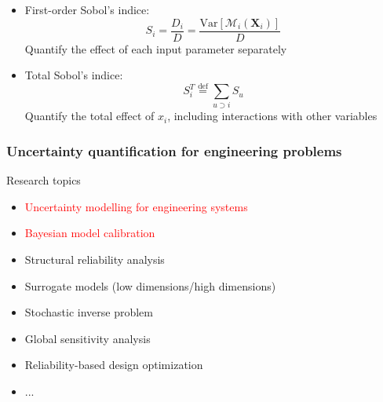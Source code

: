 \begin{frame}
{\begin{itemize}
    \item First-order Sobol's indice:
     \begin{equation*}
S_i = \frac{D_i}{D} = \frac{\text{Var}[\mathcal{M}_{i}(\boldsymbol{X}_{i}) ] }{D}
    \end{equation*}
    Quantify the effect of each input parameter \alert{separately}

    \item Total Sobol's indice:
    \begin{equation*}
S_{i}^{T} \overset{\mathrm{def}}{=}  
\sum_{u \supset i} S_u
    \end{equation*}
    Quantify the \alert{total effect} of $x_{i}$, including \alert{interactions} with other variables
\end{itemize}
}

 \end{frame}

 
\begin{frame}
\frametitle{Uncertainty quantification for engineering problems}
Research topics
\begin{itemize}
    \item \textcolor{red}{Uncertainty modelling for engineering systems}
    \item \textcolor{red}{Bayesian model calibration}
    \item Structural reliability analysis
    \item Surrogate models (low dimensions/high dimensions)
    \item Stochastic inverse problem
    \item Global sensitivity analysis
    \item Reliability-based design optimization
    \item ...
\end{itemize}

\end{frame}





